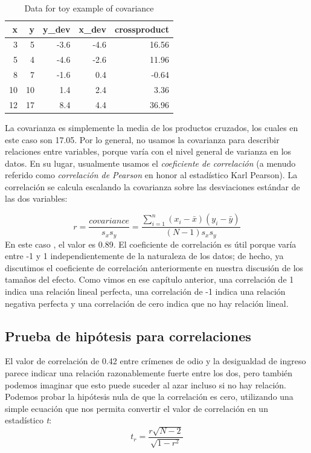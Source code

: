 \documentclass[
  12pt,
]{book}
\begin{document}
\begin{table}

\caption{\label{tab:unnamed-chunk-88}Data for toy example of covariance}
\centering
\begin{tabular}[t]{r|r|r|r|r}
\hline
x & y & y\_dev & x\_dev & crossproduct\\
\hline
3 & 5 & -3.6 & -4.6 & 16.56\\
\hline
5 & 4 & -4.6 & -2.6 & 11.96\\
\hline
8 & 7 & -1.6 & 0.4 & -0.64\\
\hline
10 & 10 & 1.4 & 2.4 & 3.36\\
\hline
12 & 17 & 8.4 & 4.4 & 36.96\\
\hline
\end{tabular}
\end{table}

La covarianza es simplemente la media de los productos cruzados, los cuales en este caso son 17.05. Por lo general, no usamos la covarianza para describir relaciones entre variables, porque varía con el nivel general de varianza en los datos. En su lugar, usualmente usamos el \emph{coeficiente de correlación} (a menudo referido como \emph{correlación de Pearson} en honor al estadístico Karl Pearson). La correlación se calcula escalando la covarianza sobre las desviaciones estándar de las dos variables:

\[
r = \frac{covariance}{s_xs_y} = \frac{\sum_{i=1}^n (x_i - \bar{x})(y_i - \bar{y})}{(N - 1)s_x s_y}
\]
En este caso , el valor es 0.89. El coeficiente de correlación es útil porque varía entre -1 y 1 independientemente de la naturaleza de los datos; de hecho, ya discutimos el coeficiente de correlación anteriormente en nuestra discusión de los tamaños del efecto. Como vimos en ese capítulo anterior, una correlación de 1 indica una relación lineal perfecta, una correlación de -1 indica una relación negativa perfecta y una correlación de cero indica que no hay relación lineal.

\hypertarget{prueba-de-hipuxf3tesis-para-correlaciones}{%
\subsection{Prueba de hipótesis para correlaciones}\label{prueba-de-hipuxf3tesis-para-correlaciones}}

El valor de correlación de 0.42 entre crímenes de odio y la desigualdad de ingreso parece indicar una relación razonablemente fuerte entre los dos, pero también podemos imaginar que esto puede suceder al azar incluso si no hay relación. Podemos probar la hipótesis nula de que la correlación es cero, utilizando una simple ecuación que nos permita convertir el valor de correlación en un estadístico \emph{t}:
\[
\textit{t}_r =  \frac{r\sqrt{N-2}}{\sqrt{1-r^2}}
\]
\end{document}
